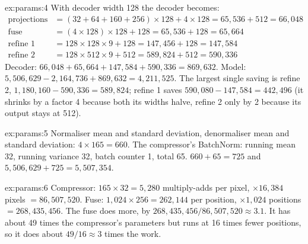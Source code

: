 \begin{solution}{ex:params:4}
With decoder width 128 the decoder becomes:
\begin{align*}
\text{projections} &= (32 + 64 + 160 + 256) \times 128 + 4 \times 128 = 65{,}536 + 512 = 66{,}048\\
\text{fuse} &= (4 \times 128) \times 128 + 128 = 65{,}536 + 128 = 65{,}664\\
\text{refine 1} &= 128 \times 128 \times 9 + 128 = 147{,}456 + 128 = 147{,}584\\
\text{refine 2} &= 128 \times 512 \times 9 + 512 = 589{,}824 + 512 = 590{,}336
\end{align*}
Decoder: $66{,}048 + 65{,}664 + 147{,}584 + 590{,}336 = 869{,}632$. Model:
$5{,}506{,}629 - 2{,}164{,}736 + 869{,}632 = 4{,}211{,}525$. The largest single saving is refine 2,
$1{,}180{,}160 - 590{,}336 = 589{,}824$; refine 1 saves $590{,}080 - 147{,}584 = 442{,}496$ (it shrinks
by a factor 4 because both its widths halve, refine 2 only by 2 because its output stays at 512).
\end{solution}

\begin{solution}{ex:params:5}
Normaliser mean and standard deviation, denormaliser mean and standard deviation: $4 \times 165 = 660$.
The compressor's BatchNorm: running mean 32, running variance 32, batch counter 1, total 65.
$660 + 65 = 725$ and $5{,}506{,}629 + 725 = 5{,}507{,}354$.
\end{solution}

\begin{solution}{ex:params:6}
Compressor: $165 \times 32 = 5{,}280$ multiply-adds per pixel, $\times 16{,}384$ pixels $=
86{,}507{,}520$. Fuse: $1{,}024 \times 256 = 262{,}144$ per position, $\times 1{,}024$ positions $=
268{,}435{,}456$. The fuse does more, by $268{,}435{,}456 / 86{,}507{,}520 \approx 3.1$. It has about 49
times the compressor's parameters but runs at 16 times fewer positions, so it does about $49/16 \approx
3$ times the work.
\end{solution}
